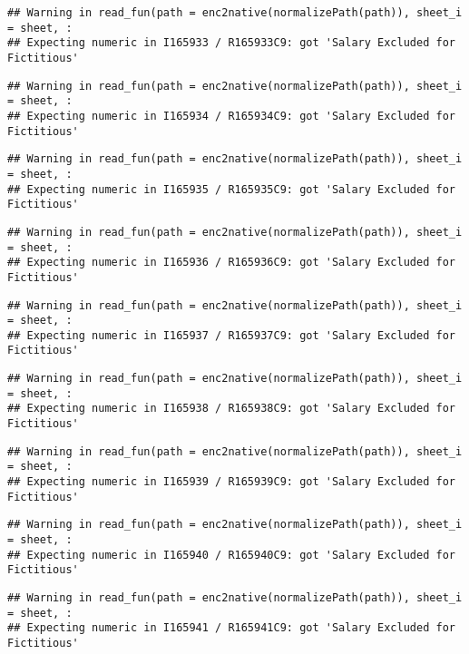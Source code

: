 \documentclass[
]{article}
\begin{document}
\begin{verbatim}
## Warning in read_fun(path = enc2native(normalizePath(path)), sheet_i = sheet, :
## Expecting numeric in I165933 / R165933C9: got 'Salary Excluded for Fictitious'
\end{verbatim}

\begin{verbatim}
## Warning in read_fun(path = enc2native(normalizePath(path)), sheet_i = sheet, :
## Expecting numeric in I165934 / R165934C9: got 'Salary Excluded for Fictitious'
\end{verbatim}

\begin{verbatim}
## Warning in read_fun(path = enc2native(normalizePath(path)), sheet_i = sheet, :
## Expecting numeric in I165935 / R165935C9: got 'Salary Excluded for Fictitious'
\end{verbatim}

\begin{verbatim}
## Warning in read_fun(path = enc2native(normalizePath(path)), sheet_i = sheet, :
## Expecting numeric in I165936 / R165936C9: got 'Salary Excluded for Fictitious'
\end{verbatim}

\begin{verbatim}
## Warning in read_fun(path = enc2native(normalizePath(path)), sheet_i = sheet, :
## Expecting numeric in I165937 / R165937C9: got 'Salary Excluded for Fictitious'
\end{verbatim}

\begin{verbatim}
## Warning in read_fun(path = enc2native(normalizePath(path)), sheet_i = sheet, :
## Expecting numeric in I165938 / R165938C9: got 'Salary Excluded for Fictitious'
\end{verbatim}

\begin{verbatim}
## Warning in read_fun(path = enc2native(normalizePath(path)), sheet_i = sheet, :
## Expecting numeric in I165939 / R165939C9: got 'Salary Excluded for Fictitious'
\end{verbatim}

\begin{verbatim}
## Warning in read_fun(path = enc2native(normalizePath(path)), sheet_i = sheet, :
## Expecting numeric in I165940 / R165940C9: got 'Salary Excluded for Fictitious'
\end{verbatim}

\begin{verbatim}
## Warning in read_fun(path = enc2native(normalizePath(path)), sheet_i = sheet, :
## Expecting numeric in I165941 / R165941C9: got 'Salary Excluded for Fictitious'
\end{verbatim}
\end{document}
